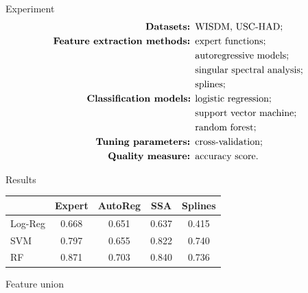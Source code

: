 \documentclass{beamer}
\begin{document}
\begin{frame}{Experiment}
		\begin{align*}
			\text{\textbf{Datasets: }} &\text{WISDM, USC-HAD;}\\
		\text{\textbf{Feature extraction methods: }} &\text{expert functions;}\\ &\text{autoregressive models;}\\ &\text{singular spectral analysis;}\\ &\text{splines;}\\
		\text{\textbf{Classification models:} } &\text{logistic regression;}\\ &\text{support vector machine;}\\ &\text{random forest;}\\
		\text{\textbf{Tuning parameters: }} &\text{cross-validation;}\\
		\text{\textbf{Quality measure: }} &\text{accuracy score.}
		\end{align*}

\end{frame}
\begin{frame}{Results}
	\begin{table}[]
		\centering
		\label{my-label}
		\begin{tabular}{|l|c|c|c|c|}
			\hline
			 & Expert & AutoReg & SSA & Splines\\
			\hline
			Log-Reg &    0.668    &    0.651     &   0.637  & 0.415  \\
			\hline
			SVM     &    0.797    &     0.655    &   0.822  & 0.740\\
			\hline
			RF      &    0.871    &     0.703    &  0.840 & 0.736 \\
			\hline
		\end{tabular}
	\end{table}

\end{frame}
\begin{frame}{Feature union}

\end{frame}
\end{document}
